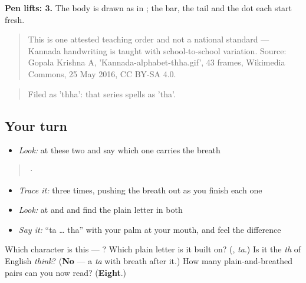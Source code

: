 \textbf{Pen lifts: 3.} The body is drawn as in ; the bar, the tail and the dot each start fresh.

\begin{quote}
This is one attested teaching order and not a national standard — Kannada handwriting is taught with school-to-school variation. Source: Gopala Krishna A, 'Kannada-alphabet-thha.gif', 43 frames, Wikimedia Commons, 25 May 2016, CC BY-SA 4.0.
\end{quote}

\begin{quote}
Filed as 'thha': that series spells  as 'tha'.
\end{quote}

\subsection*{Your turn}
\begin{itemize}
\raggedright
  \item \emph{Look:} at these two and say which one carries the breath
\end{itemize}

\begin{quote}
  ·  
\end{quote}

\begin{itemize}
\raggedright
  \item \emph{Trace it:}  three times, pushing the breath out as you finish each one
  \item \emph{Look:} at  and  and find the plain letter in both
  \item \emph{Say it:} \textquotedblleft{}ta … tha\textquotedblright{} with your palm at your mouth, and feel the difference
\end{itemize}

\begin{tcolorbox}[breakable,colback=teal!4,colframe=teal!35!black,title={Before you move on}]
Which character is this — ? Which plain letter is it built on? (\textbf{}, \emph{ta}.) Is it the \emph{th} of English \emph{think}? (\textbf{No} — a \emph{ta} with breath after it.) How many plain-and-breathed pairs can you now read? (\textbf{Eight}.)
\end{tcolorbox}

